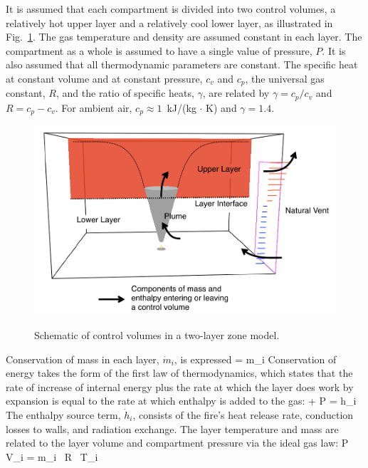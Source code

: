  It is assumed that each compartment is divided into two control volumes, a relatively hot upper layer and a relatively cool lower layer, as illustrated in Fig.~\ref{fig:Control_Volumes}. The gas temperature and density are assumed constant in each layer. The compartment as a whole is assumed to have a single value of pressure, $P$. It is also assumed that all thermodynamic parameters are constant. The specific heat at constant volume and at constant pressure, $c_v$ and $c_p$, the universal gas constant, $R$, and the ratio of specific heats, $\gamma$, are related by $\gamma = c_p / c_v$ and $R = c_p- c_v$.  For ambient air, $c_p \approx 1$~kJ/(kg $\cdot$ K) and $\gamma = 1.4$.
\begin{figure}[h]
\begin{center}
\includegraphics[width=\textwidth]{FIGURES/Theory/Control_Volumes}\\
\end{center}
\caption{Schematic of control volumes in a two-layer zone model.}
 \label{fig:Control_Volumes}
\end{figure}
Conservation of mass in each layer, $\dot m_i$, is expressed
\be 
    = \dot m_i  \label{mass_con}
\ee
Conservation of energy takes the form of the first law of thermodynamics, which states that the rate of increase of internal energy plus the rate at which the layer does work by expansion is equal to the rate at which enthalpy is added to the gas:
\be 
    +  P  =  \dot h_i \label{eq:first_law} 
\ee
The enthalpy source term, $\dot h_i$, consists of the fire's heat release rate, conduction losses to walls, and radiation exchange. The layer temperature and mass are related to the layer volume and compartment pressure via the ideal gas law:
\be
  P \, V_i = m_i \, R \, T_i \label{EoS}
